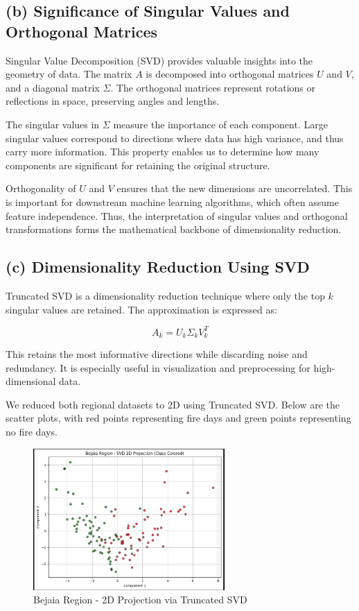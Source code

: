 \documentclass[12pt]{article}
\begin{document}
\subsection*{(b) Significance of Singular Values and Orthogonal Matrices}

Singular Value Decomposition (SVD) provides valuable insights into the geometry of data. The matrix \( A \) is decomposed into orthogonal matrices \( U \) and \( V \), and a diagonal matrix \( \Sigma \). The orthogonal matrices represent rotations or reflections in space, preserving angles and lengths.

The singular values in \( \Sigma \) measure the importance of each component. Large singular values correspond to directions where data has high variance, and thus carry more information. This property enables us to determine how many components are significant for retaining the original structure.

Orthogonality of \( U \) and \( V \) ensures that the new dimensions are uncorrelated. This is important for downstream machine learning algorithms, which often assume feature independence. Thus, the interpretation of singular values and orthogonal transformations forms the mathematical backbone of dimensionality reduction.

\subsection*{(c) Dimensionality Reduction Using SVD}

Truncated SVD is a dimensionality reduction technique where only the top \( k \) singular values are retained. The approximation is expressed as:

\[
A_k = U_k \Sigma_k V_k^T
\]

This retains the most informative directions while discarding noise and redundancy. It is especially useful in visualization and preprocessing for high-dimensional data.

We reduced both regional datasets to 2D using Truncated SVD. Below are the scatter plots, with red points representing fire days and green points representing no fire days.

\begin{figure}[h!]
    \centering
    \includegraphics[width=0.65\textwidth]{images/svd_pca_lda/bejaia_svd.png}
    \caption{Bejaia Region - 2D Projection via Truncated SVD}
\end{figure}
\end{document}
